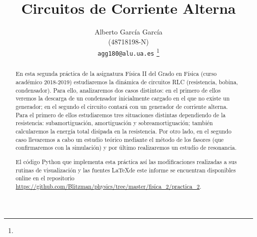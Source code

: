 \documentclass[journal]{IEEEtran}
\begin{document}
%
\title{Circuitos de Corriente Alterna}
%
%
%

\author{Alberto García García\\ (48718198-N)\\ \texttt{agg180@alu.ua.es} %
\thanks{}%
}


%
{}
% 


\maketitle

\begin{abstract}
En esta segunda práctica de la asignatura Física II del Grado en Física (curso académico 2018-2019) estudiaremos la dinámica de circuitos RLC (resistencia, bobina, condensador). Para ello, analizaremos dos casos distintos: en el primero de ellos veremos la descarga de un condensador inicialmente cargado en el que no existe un generador; en el segundo el circuito contará con un generador de corriente alterna. Para el primero de ellos estudiaremos tres situaciones distintas dependiendo de la resistencia: subamortiguación, amortiguación y sobreamortiguación; también calcularemos la energía total disipada en la resistencia. Por otro lado, en el segundo caso llevaremos a cabo un estudio teórico mediante el método de los fasores (que confirmaremos con la simulación) y por último realizaremos un estudio de resonancia.

El código Python que implementa esta práctica así las modificaciones realizadas a sus rutinas de visualización y las fuentes \LaTeX de este informe se encuentran disponibles online en el repositorio \url{https://github.com/Blitzman/physics/tree/master/fisica_2/practica_2}.
\end{abstract}
\end{document}
